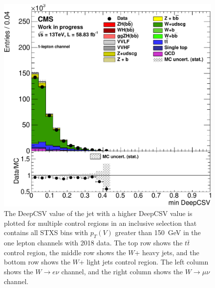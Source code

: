 \begin{figure}
  \includegraphics[width=0.42\linewidth]{figures/2018_Wln/Wlf_medhigh_Wmn__Hj1_DeepCSV_.pdf}
  \caption[Control region plots for one lepton in 2018]{
    The DeepCSV value of the jet with a higher DeepCSV value
    is plotted for multiple control regions in
    an inclusive selection that contains all STXS bins with
    $p_T(V)$ greater than \SI{150}{GeV}
    in the one lepton channels with 2018 data.
    The top row shows the $t\bar{t}$ control region,
    the middle row shows the $W$+ heavy jets,
    and the bottom row shows the $W$+ light jets control region.
    The left column shows the  $W\rightarrow e\nu$ channel,
    and the right column shows the $W\rightarrow \mu\nu$ channel.
  }
  \label{fig:2018_Wln_j1csv}
\end{figure}

